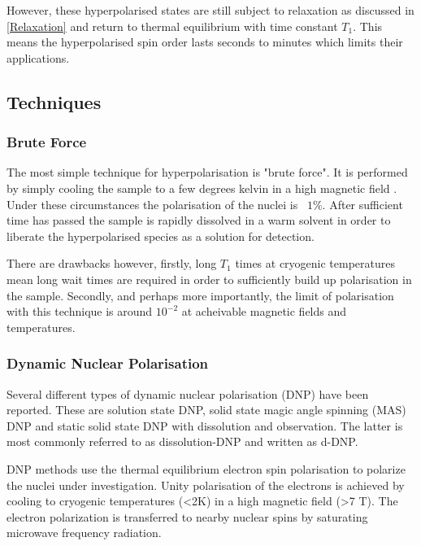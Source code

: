  However, these hyperpolarised states are still subject to relaxation as discussed in \ref{Relaxation} and
 return to thermal equilibrium with time constant $T_1$. This means the hyperpolarised spin order lasts seconds
 to minutes which limits their applications.

 \subsection{Techniques}

 \subsubsection{Brute Force}

 The most simple technique for hyperpolarisation is "brute force". It is performed by simply
 cooling the sample to a few degrees kelvin in a high magnetic field \citep{RN155,RN157}. Under
 these circumstances the polarisation of the nuclei is ~$1\%$. After sufficient time has passed
 the sample is rapidly dissolved in a warm solvent in order to liberate the hyperpolarised
 species as a solution for detection.

 There are drawbacks however, firstly, long $T_1$ times at cryogenic temperatures mean long
 wait times are required in order to sufficiently build up polarisation in the sample. Secondly, and
 perhaps more importantly, the limit of polarisation with this technique is around $10^{-2}$ at acheivable
 magnetic fields and temperatures.

 \subsubsection{Dynamic Nuclear Polarisation}

 Several different types of dynamic nuclear polarisation (DNP) have been reported. These are solution
 state DNP\citep{RN158}, solid state magic angle spinning (MAS) DNP\citep{RN159} and static solid state DNP with
 dissolution and observation\citep{RN160}. The latter is most commonly referred to as dissolution-DNP and written as d-DNP.

 DNP methods use the thermal equilibrium electron spin polarisation to polarize the nuclei under investigation. Unity
 polarisation of the electrons is achieved by cooling to cryogenic temperatures (<2K) in a high magnetic field (>7 T).
 The electron polarization is transferred to nearby nuclear spins by saturating microwave frequency radiation.

